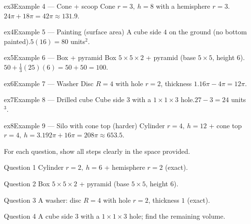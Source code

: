 \documentclass[11pt]{article}
\begin{document}
\begin{example}{ex3}{Example 4 --- Cone + scoop}
Cone $r=3,\ h=8$ with a hemisphere $r=3$.\soln $24\pi+18\pi=42\pi\approx131.9$.
\end{example}

\begin{example}{ex4}{Example 5 --- Painting (surface area)}
A cube side $4$ on the ground (no bottom painted).\soln $5(16)=80$ units$^2$.
\end{example}

\begin{example}{ex5}{Example 6 --- Box + pyramid}
Box $5\times5\times2$ + pyramid (base $5\times5$, height $6$).\soln $50+\tfrac13(25)(6)=50+50=100$.
\end{example}

\begin{example}{ex6}{Example 7 --- Washer}
Disc $R=4$ with hole $r=2$, thickness $1$.\soln $16\pi-4\pi=12\pi$.
\end{example}

\begin{example}{ex7}{Example 8 --- Drilled cube}
Cube side $3$ with a $1\times1\times3$ hole.\soln $27-3=24$ units$^3$.
\end{example}

\begin{example}{ex8}{Example 9 --- Silo with cone top (harder)}
Cylinder $r=4,\ h=12$ + cone top $r=4,\ h=3$.\soln $192\pi+16\pi=208\pi\approx653.5$.
\end{example}

\clearpage
{}
For each question, show all steps clearly in the space provided.

\begin{qbox}{Question 1}
Cylinder $r=2,\ h=6$ + hemisphere $r=2$ (exact).\workspace{2.2cm}
\end{qbox}

\begin{qbox}{Question 2}
Box $5\times5\times2$ + pyramid (base $5\times5$, height $6$).\workspace{2.2cm}
\end{qbox}

\begin{qbox}{Question 3}
A washer: disc $R=4$ with hole $r=2$, thickness $1$ (exact).\workspace{2.2cm}
\end{qbox}

\begin{qbox}{Question 4}
A cube side $3$ with a $1\times1\times3$ hole; find the remaining volume.\workspace{2.2cm}
\end{qbox}
\end{document}
